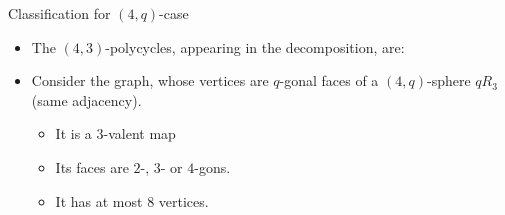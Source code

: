 \documentclass[%
pdf,
colorBG,
slideColor,
]{prosper}
\begin{document}
\begin{slide}{Classification for $(4,q)$-case}
\begin{itemize}
\item The $(4,3)$-polycycles, appearing in the decomposition, are:
\begin{center}
\end{center}
\begin{center}
\end{center}

\item Consider the graph, whose vertices are $q$-gonal faces of a $(4,q)$-sphere $qR_3$ (same adjacency).
\begin{itemize}
\item It is a $3$-valent map
\item Its faces are $2$-, $3$- or $4$-gons.
\item It has at most $8$ vertices.
\end{itemize}

\end{itemize}
\end{slide}
\end{document}

